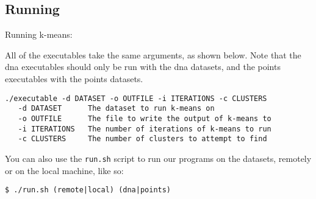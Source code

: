 \documentclass[12pt]{article}
\begin{document}
 \subsection{Running}

Running k-means:

All of the executables take the same arguments, as shown below. Note that the dna executables should only be run with the dna datasets, and the points executables with the points datasets.

\begin{verbatim}
./executable -d DATASET -o OUTFILE -i ITERATIONS -c CLUSTERS
   -d DATASET      The dataset to run k-means on
   -o OUTFILE      The file to write the output of k-means to
   -i ITERATIONS   The number of iterations of k-means to run
   -c CLUSTERS     The number of clusters to attempt to find
\end{verbatim}

You can also use the \texttt{run.sh} script to run our programs on the
datasets, remotely or on the local machine, like so:

\begin{verbatim}
$ ./run.sh (remote|local) (dna|points)
\end{verbatim}
\end{document}
